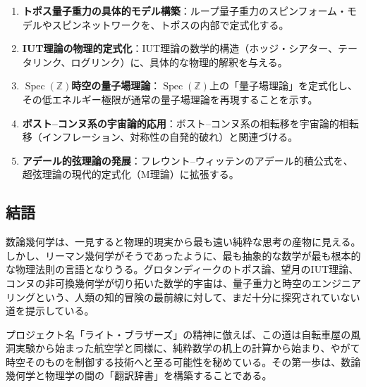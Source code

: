 \documentclass[12pt,a4paper]{ltjsarticle}
\theoremstyle{definition}
\newcommand{\Spec}{\operatorname{Spec}}
\begin{document}
\begin{enumerate}[leftmargin=2em]
  \item \textbf{トポス量子重力の具体的モデル構築}：ループ量子重力のスピンフォーム・モデルやスピンネットワーク\cite{Rovelli2004}を、トポスの内部で定式化する。
  \item \textbf{IUT理論の物理的定式化}：IUT理論の数学的構造（ホッジ・シアター、テータリンク、ログリンク）に、具体的な物理的解釈を与える。
  \item \textbf{$\Spec(\mathbb{Z})$時空の量子場理論}：$\Spec(\mathbb{Z})$上の「量子場理論」を定式化し、その低エネルギー極限が通常の量子場理論を再現することを示す。
  \item \textbf{ボスト--コンヌ系の宇宙論的応用}：ボスト--コンヌ系の相転移を宇宙論的相転移（インフレーション、対称性の自発的破れ）と関連づける。
  \item \textbf{アデール的弦理論の発展}：フレウント--ウィッテンのアデール的積公式を、超弦理論の現代的定式化（M理論）に拡張する。
\end{enumerate}

\subsection{結語}

数論幾何学は、一見すると物理的現実から最も遠い純粋な思考の産物に見える。しかし、リーマン幾何学がそうであったように、最も抽象的な数学が最も根本的な物理法則の言語となりうる。グロタンディークのトポス論、望月のIUT理論、コンヌの非可換幾何学が切り拓いた数学的宇宙は、量子重力と時空のエンジニアリングという、人類の知的冒険の最前線に対して、まだ十分に探究されていない道を提示している。

プロジェクト名「ライト・ブラザーズ」の精神に倣えば、この道は自転車屋の風洞実験から始まった航空学と同様に、純粋数学の机上の計算から始まり、やがて時空そのものを制御する技術へと至る可能性を秘めている。その第一歩は、数論幾何学と物理学の間の「翻訳辞書」を構築することである。
\end{document}
